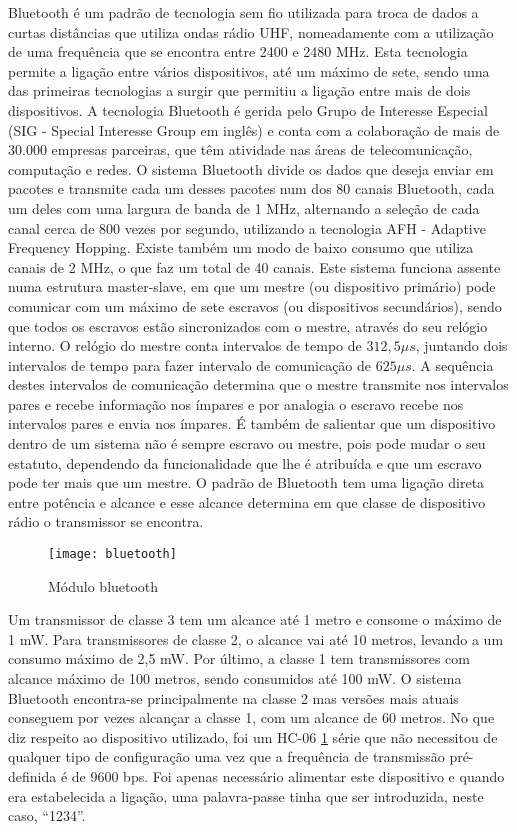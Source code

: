 Bluetooth é um padrão de tecnologia sem fio utilizada para troca de dados a curtas distâncias que utiliza ondas rádio UHF, nomeadamente com a utilização de uma frequência que se encontra entre 2400 e 2480 MHz.
Esta tecnologia permite a ligação entre vários dispositivos, até um máximo de sete, sendo uma das primeiras tecnologias a surgir que permitiu a ligação entre mais de dois dispositivos.
A tecnologia Bluetooth é gerida pelo Grupo de Interesse Especial (SIG - Special Interesse Group em inglês) e conta com a colaboração de mais de 30.000 empresas parceiras, que têm atividade nas áreas de telecomunicação, computação e redes.
O sistema Bluetooth divide os dados que deseja enviar em pacotes e transmite cada um desses pacotes num dos 80 canais Bluetooth, cada um deles com uma largura de banda de 1 MHz, alternando a seleção de cada canal cerca de 800 vezes por segundo, utilizando a tecnologia AFH - Adaptive Frequency Hopping.
Existe também um modo de baixo consumo que utiliza canais de 2 MHz, o que faz um total de 40 canais.
Este sistema funciona assente numa estrutura master-slave, em que um mestre (ou dispositivo primário) pode comunicar com um máximo de sete escravos (ou dispositivos secundários), sendo que todos os escravos estão sincronizados com o mestre, através do seu relógio interno.
O relógio do mestre conta intervalos de tempo de $312,5 \mu s$, juntando dois intervalos de tempo para fazer intervalo de comunicação de $625 \mu s$.
A sequência destes intervalos de comunicação determina que o mestre transmite nos intervalos pares e recebe informação nos ímpares e por analogia o escravo recebe nos intervalos pares e envia nos ímpares.
É também de salientar que um dispositivo dentro de um sistema não é sempre escravo ou mestre, pois pode mudar o seu estatuto, dependendo da funcionalidade que lhe é atribuída e que um escravo pode ter mais que um mestre.
O padrão de Bluetooth tem uma ligação direta entre potência e alcance e esse alcance determina em que classe de dispositivo rádio o transmissor se encontra.

\begin{figure}[hbtp]
	\centering
	\texttt{[image: bluetooth]}
	\caption[Módulo bluetooth]{Módulo bluetooth \footnotemark}
	\label{fig:modulo_bluetooth}
\end{figure}

Um transmissor de classe 3 tem um alcance até 1 metro e consome o máximo de 1 mW.
Para transmissores de classe 2, o alcance vai até 10 metros, levando a um consumo máximo de 2,5 mW.
Por último, a classe 1 tem transmissores com alcance máximo de 100 metros, sendo consumidos até 100 mW.
O sistema Bluetooth encontra-se principalmente na classe 2 mas versões mais atuais conseguem por vezes alcançar a classe 1, com um alcance de 60 metros.
No que diz respeito ao dispositivo utilizado, foi um HC-06 \ref{fig:modulo_bluetooth} série que não necessitou de qualquer tipo de configuração uma vez que a frequência de transmissão pré-definida é de 9600 bps.
Foi apenas necessário alimentar este dispositivo e quando era estabelecida a ligação, uma palavra-passe tinha que ser introduzida, neste caso, ``1234''.

